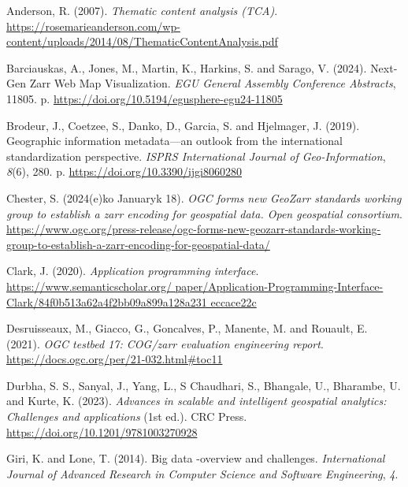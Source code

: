 \documentclass[
  oneside,
  open=any]{scrbook}
\newlength{\cslhangindent}
\newenvironment{CSLReferences}[2] %
 {\begin{list}{}{%
  \setlength{\itemindent}{0pt}
  \setlength{\leftmargin}{0pt}
  \setlength{\parsep}{0pt}
  \ifodd #1
   \setlength{\leftmargin}{\cslhangindent}
   \setlength{\itemindent}{-1\cslhangindent}
  \fi
  \setlength{\itemsep}{#2\baselineskip}}}
 {\end{list}}
\begin{document}
\label{refs}
\begin{CSLReferences}{1}{0}
Anderson, R. (2007). \emph{Thematic content analysis ({TCA})}.
\url{https://rosemarieanderson.com/wp-content/uploads/2014/08/ThematicContentAnalysis.pdf}

Barciauskas, A., Jones, M., Martin, K., Harkins, S. and Sarago, V.
(2024). {Next-Gen Zarr Web Map Visualization}. \emph{EGU General
Assembly Conference Abstracts}, 11805. p.
\url{https://doi.org/10.5194/egusphere-egu24-11805}

Brodeur, J., Coetzee, S., Danko, D., Garcia, S. and Hjelmager, J.
(2019). Geographic information metadata---an outlook from the
international standardization perspective. \emph{{ISPRS} International
Journal of Geo-Information}, \emph{8}(6), 280. p.
\url{https://doi.org/10.3390/ijgi8060280}

Chester, S. (2024(e)ko Januaryk 18). \emph{{OGC} forms new {GeoZarr}
standards working group to establish a zarr encoding for geospatial
data. Open geospatial consortium}.
\url{https://www.ogc.org/press-release/ogc-forms-new-geozarr-standards-working-group-to-establish-a-zarr-encoding-for-geospatial-data/}

Clark, J. (2020). \emph{Application programming interface}.
\href{https://www.semanticscholar.org/\%20paper/Application-Programming-Interface-Clark/84f0b513a62a4f2bb09a899a128a231\%20eccace22c}{https://www.semanticscholar.org/
paper/Application-Programming-Interface-Clark/84f0b513a62a4f2bb09a899a128a231
eccace22c}

Desruisseaux, M., Giacco, G., Goncalves, P., Manente, M. and Rouault, E.
(2021). \emph{{OGC} testbed 17: {COG}/zarr evaluation engineering
report}. \url{https://docs.ogc.org/per/21-032.html\#toc11}

Durbha, S. S., Sanyal, J., Yang, L., S Chaudhari, S., Bhangale, U.,
Bharambe, U. and Kurte, K. (2023). \emph{Advances in scalable and
intelligent geospatial analytics: Challenges and applications} (1st
ed.). {CRC} Press. \url{https://doi.org/10.1201/9781003270928}

Giri, K. and Lone, T. (2014). Big data -overview and challenges.
\emph{International Journal of Advanced Research in Computer Science and
Software Engineering}, \emph{4}.


\end{CSLReferences}
\end{document}
